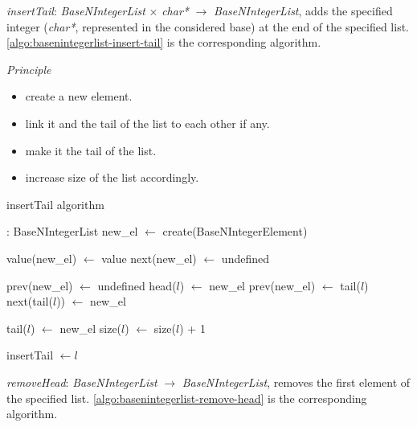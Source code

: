 \documentclass[book, nodocumentinfo]{upmethodology-document}
\begin{document}

\emph{insertTail}: \emph{BaseNIntegerList} \(\times\) \emph{char*} \(\rightarrow\) \emph{BaseNIntegerList},
adds the specified integer (\emph{char*}, represented in the considered base) at the end
of the specified list.
\ref{algo:basenintegerlist-insert-tail} is the corresponding algorithm.

\emph{Principle}
\begin{itemize}
    \item create a new element.
    \item link it and the tail of the list to each other if any.
    \item make it the tail of the list.
    \item increase size of the list accordingly.
\end{itemize}

\begin{algorithm}[H]
    \label{algo:basenintegerlist-insert-tail}
    \caption{insertTail algorithm}

    \begin{algorithmic}
         : BaseNIntegerList
            \State new\_el \(\leftarrow\) create(BaseNIntegerElement)

            \State value(new\_el) \(\leftarrow\) value
            \State next(new\_el) \(\leftarrow\) undefined

                \State prev(new\_el) \(\leftarrow\) undefined
                \State head(\(l\)) \(\leftarrow\) new\_el
            \Else
                \State prev(new\_el) \(\leftarrow\) tail(\(l\))
                \State next(tail(\(l\))) \(\leftarrow\) new\_el
            \EndIf

            \State tail(\(l\)) \(\leftarrow\) new\_el
            \State size(\(l\)) \(\leftarrow\) size(\(l\)) + 1

            \State insertTail \(\leftarrow l\)
        \EndFunction
    \end{algorithmic}
\end{algorithm}


\emph{removeHead}: \emph{BaseNIntegerList} \(\rightarrow\) \emph{BaseNIntegerList},
removes the first element of the specified list.
\ref{algo:basenintegerlist-remove-head} is the corresponding algorithm.
\end{document}
